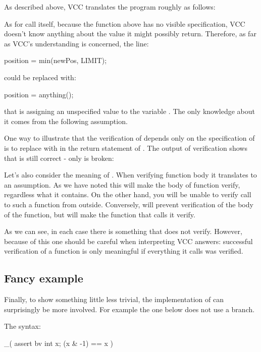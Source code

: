 As described above, VCC translates the program roughly as follows:

As for call itself, because the  function above has no
visible specification, VCC doesn't know anything about the value it
might possibly return.  Therefore, as far as VCC's understanding is
concerned, the line:
\begin{VCC}
position = min(newPos, LIMIT);
\end{VCC}
\noindent
could be replaced with:
\begin{VCC}
position = anything();
\end{VCC}
\noindent
that is assigning an unspecified value to the variable .
The only knowledge about it comes from the following assumption.

One way to illustrate that the verification of  
depends only on the specification of  is to 
replace \vcc{<} with \vcc{>} in the return statement of .
The output of verification shows that  is still correct -
only  is broken:

Let's also consider the meaning of .
When verifying function body it translates to an assumption.
As we have noted this will make the body of function verify,
regardless what it contains.
On the other hand, you will be unable to verify call to such a function
from outside.
Conversely,  will prevent verification
of the body of the function, but will make the function that calls
it verify.

As we can see, in each case there is something that does not verify.
However, because of this one should be careful when interpreting
VCC answers: successful verification of a function is only meaningful
if everything it calls was verified.

\subsection{Fancy example}
Finally, 
to show something little less trivial, the implementation of  can surprisingly be more involved.
For example the one below does not use a branch.


\noindent
The syntax:
\begin{VCC}
_( assert {bv} \forall int x; (x & -1) == x )
\end{VCC}

